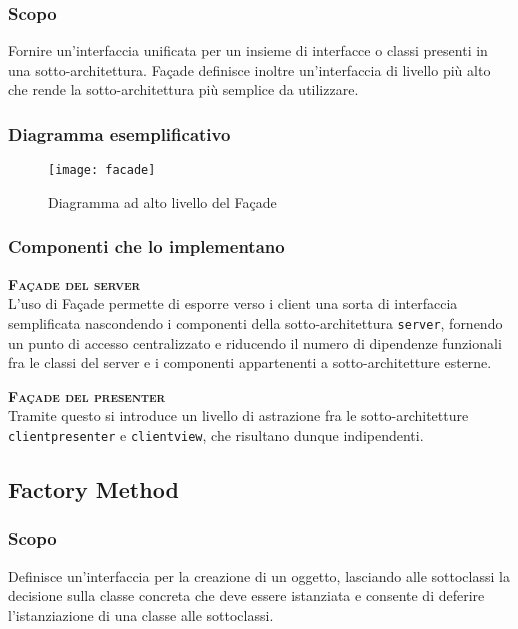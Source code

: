\subsubsection{Scopo}
Fornire un'interfaccia unificata per un insieme di interfacce o classi presenti in una sotto-architettura. Façade definisce inoltre un'interfaccia di livello più alto che rende la sotto-architettura più semplice da utilizzare.

\subsubsection{Diagramma esemplificativo}
\begin{figure}[H]
\centering
\texttt{[image: facade]}
\caption{Diagramma ad alto livello del  Façade}\label{fig:façade}
\end{figure}

\subsubsection{Componenti che lo implementano}
\begin{description}
  \item{\scshape\bfseries Façade del server}\\
L'uso di Façade permette di esporre verso i client una sorta di interfaccia semplificata nascondendo i componenti della sotto-architettura \texttt{server}, fornendo un punto di accesso centralizzato e riducendo il numero di dipendenze funzionali fra le classi del server e i componenti appartenenti a sotto-architetture esterne.
  \item{\scshape\bfseries Façade del presenter}\\
Tramite questo  si introduce un livello di astrazione fra le sotto-architetture \texttt{clientpresenter} e \texttt{clientview}, che risultano dunque indipendenti.
\end{description}

\subsection{Factory Method}

\subsubsection{Scopo}
Definisce un'interfaccia per la creazione di un oggetto, lasciando alle sottoclassi la decisione sulla classe concreta che deve essere istanziata e consente di deferire l'istanziazione di una classe alle sottoclassi.

